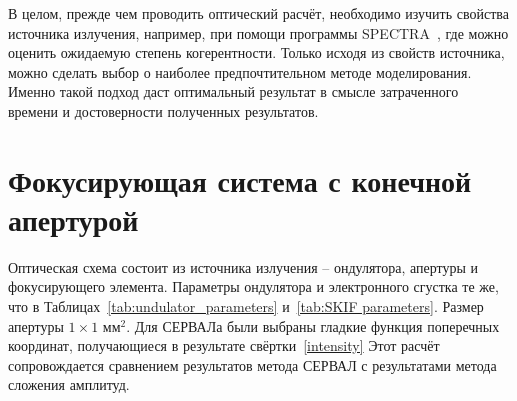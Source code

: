 В целом, прежде чем проводить оптический расчёт, необходимо изучить свойства источника излучения, например, при помощи программы SPECTRA~\cite{tanaka_spectra_2001}, где можно оценить ожидаемую степень когерентности. Только исходя из свойств источника, можно сделать выбор о наиболее предпочтительном методе моделирования. Именно такой подход даст оптимальный результат в смысле затраченного времени и достоверности полученных результатов. 

\section{Фокусирующая система с конечной апертурой}\label{section:focusing_system_with_aperture}
Оптическая схема состоит из источника излучения -- ондулятора, апертуры и фокусирующего элемента. Параметры ондулятора и электронного сгустка те же, что в Таблицах~\ref{tab:undulator_parameters} и~\ref{tab:SKIF parameters}. Размер апертуры $1 \times 1$ мм$^2$. Для СЕРВАЛа были выбраны гладкие функция поперечных координат, получающиеся в результате свёртки~\ref{intensity} Этот расчёт сопровождается сравнением результатов метода СЕРВАЛ с результатами метода сложения амплитуд.

